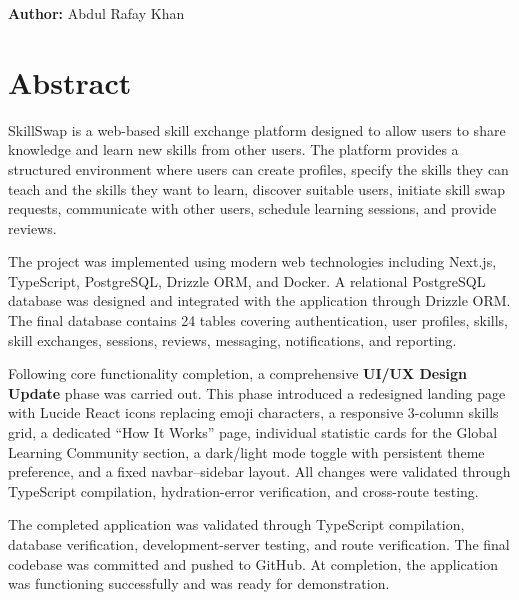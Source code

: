 \documentclass[12pt,a4paper]{report}
\begin{document}
\vspace{2cm}
\begin{flushright}
\textbf{Author:} Abdul Rafay Khan
\end{flushright}

\chapter*{Abstract}

SkillSwap is a web-based skill exchange platform designed to allow users to share
knowledge and learn new skills from other users.  The platform provides a
structured environment where users can create profiles, specify the skills they
can teach and the skills they want to learn, discover suitable users, initiate
skill swap requests, communicate with other users, schedule learning sessions,
and provide reviews.

The project was implemented using modern web technologies including Next.js,
TypeScript, PostgreSQL, Drizzle ORM, and Docker.  A relational PostgreSQL database
was designed and integrated with the application through Drizzle ORM.  The final
database contains 24 tables covering authentication, user profiles, skills, skill
exchanges, sessions, reviews, messaging, notifications, and reporting.

Following core functionality completion, a comprehensive \textbf{UI/UX Design
Update} phase was carried out.  This phase introduced a redesigned landing page
with Lucide React icons replacing emoji characters, a responsive 3-column skills
grid, a dedicated ``How It Works'' page, individual statistic cards for the
Global Learning Community section, a dark/light mode toggle with persistent
theme preference, and a fixed navbar--sidebar layout.  All changes were validated
through TypeScript compilation, hydration-error verification, and cross-route
testing.

The completed application was validated through TypeScript compilation, database
verification, development-server testing, and route verification.  The final
codebase was committed and pushed to GitHub.  At completion, the application was
functioning successfully and was ready for demonstration.

\tableofcontents
\newpage

\end{document}
